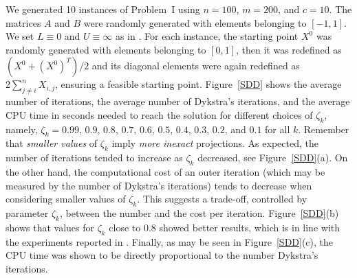 We generated 10 instances of Problem~I using $n=100$, $m=200$, and $c=10$. The matrices $A$ and $B$ were randomly generated with elements belonging to $[-1,1]$. We set $L\equiv 0$ and $U\equiv \infty$ as in \cite{BirginMartinezRaydan2003}. For each instance, the starting point $X^0$ was randomly generated with elements belonging to $[0,1]$, then it was redefined as $(X^0 + (X^0)^T )/2$ and its diagonal elements were again redefined as $2\sum_{j\neq i}^n X_{i,j}$, ensuring a feasible starting point. Figure~\ref{SDD} shows the average number of iterations,  the average number of Dykstra’s iterations, and the average  CPU time in seconds needed to reach the solution for different choices of $\zeta_k$, namely, $\zeta_k=0.99$, $0.9$, $0.8$, $0.7$, $0.6$, $0.5$, $0.4$, $0.3$, $0.2$, and $0.1$ for all $k$.
Remember that {\it smaller values} of  $\zeta_k$ imply {\it more inexact} projections. As expected, the number of iterations  tended to increase as $\zeta_k$ decreased, see  Figure~\ref{SDD}(a).
On the other hand, the computational cost of an outer iteration (which may be measured by the number of Dykstra’s iterations) tends to decrease when considering smaller values of $\zeta_k$.
This suggests a trade-off, controlled by parameter $\zeta_k$, between the number and the cost per iteration.
Figure~\ref{SDD}(b) shows that values for $\zeta_k$ close to 0.8 showed better results, which is in line with the experiments reported in \cite{BirginMartinezRaydan2003}.
Finally, as may be seen in Figure~\ref{SDD}(c), the CPU time was shown to be directly proportional to the number Dykstra’s iterations.
